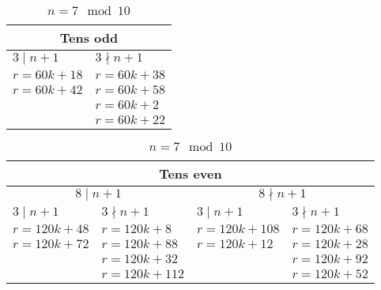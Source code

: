 \documentclass{article}
\begin{document}
\begin{table}[H]
\centering
\caption{$n=7 \mod 10$}
\label{table:22}
\begin{tabular}{|l|l|}
\hline
\multicolumn{2}{|c|}{Tens odd} \\ \hline
$3 \mid n+1$ & $3 \nmid n+1$         \\ \hline
$r=60k+18$ & $r=60k+38$       \\ \hline
$r=60k+42$ & $r=60k+58$       \\ \hline
             & $r=60k+2$        \\ \hline
             & $r=60k+22$         \\ \hline
\end{tabular}

\bigskip

\begin{tabular}{|l|l|l|l|}
\hline
\multicolumn{4}{|c|}{Tens even} \\ \hline
\multicolumn{2}{|c|}{$8 \mid n+1$} & \multicolumn{2}{|c|}{$8 \nmid n+1$} \\ \hline
$3 \mid n+1$ & $3 \nmid n+1$  & $3 \mid n+1$ & $3 \nmid n+1$  \\ \hline
$r=120k+48$  & $r=120k+8$ & $r=120k+108$   & $r=120k+68$ \\ \hline
$r=120k+72$  & $r=120k+88$ & $r=120k+12$   & $r=120k+28$ \\ \hline
             & $r=120k+32$ &               & $r=120k+92$ \\ \hline
             & $r=120k+112$ &               & $r=120k+52$  \\ \hline
\end{tabular}
\end{table}
\end{document}
